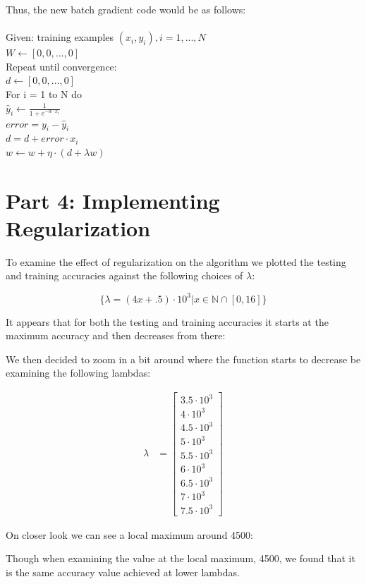 \documentclass{article}
\newcommand\tab[1][1cm]{\hspace*{#1}}
\begin{document}
Thus, the new batch gradient code would be as follows:\\
\\
Given: training examples $(x_{i}, y_{i}), i = 1, ..., N$ \\
$W \leftarrow [0, 0, ..., 0]$ \\
Repeat until convergence: \\
\tab $ d \leftarrow [0, 0, ..., 0]$ \\
\tab For i = 1 to N do \\
\tab \tab $\hat{y}_{i} \leftarrow \frac{1}{1 + e^{-w \cdot x_{i}}}$ \\
\tab \tab $error = y_{i} - \hat{y}_{i}$ \\
\tab \tab $d = d + error \cdot x_{i}$ \\
\tab $w \leftarrow w + \eta \cdot (d + \lambda w)$
		


	
	\section*{Part 4: Implementing Regularization}
	
To examine the effect of regularization on the algorithm we plotted the testing and training accuracies against the following choices of $\lambda$:

$$
\{\lambda = (4x + .5) \cdot 10^{3} |x\in{\mathbb{N} \cap [0,16]} \}
$$


It appears that for both the testing and training accuracies it starts at the maximum accuracy and then decreases from there:
\newpage


We then decided to zoom in a bit around where the function starts to decrease be examining the following lambdas:
	
	\begin{align}
		\lambda &= \begin{bmatrix}
		3.5 \cdot 10^{3} \\
		4 \cdot 10^{3} \\
		4.5 \cdot 10^{3} \\
		5 \cdot 10^{3} \\
		5.5 \cdot 10^{3} \\
		6 \cdot 10^{3} \\
		6.5 \cdot 10^{3} \\
		7 \cdot 10^{3} \\
		7.5 \cdot 10^{3}
		\end{bmatrix} 
	\end{align}
	
On closer look we can see a local maximum around 4500:

	
Though when examining the value at the local maximum, 4500, we found that it is the same accuracy value achieved at lower lambdas.


	
	
\end{document}

